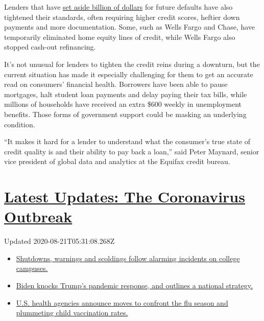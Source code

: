 Lenders that have
\href{https://www.nytimes3xbfgragh.onion/2020/07/14/business/big-banks-quarterly-results.html}{set
aside billion of dollars} for future defaults have also tightened their
standards, often requiring higher credit scores, heftier down payments
and more documentation. Some, such as Wells Fargo and Chase, have
temporarily eliminated home equity lines of credit, while Wells Fargo
also stopped cash-out refinancing.

It's not unusual for lenders to tighten the credit reins during a
downturn, but the current situation has made it especially challenging
for them to get an accurate read on consumers' financial health.
Borrowers have been able to pause mortgages, halt student loan payments
and delay paying their tax bills, while millions of households have
received an extra \$600 weekly in unemployment benefits. Those forms of
government support could be masking an underlying condition.

``It makes it hard for a lender to understand what the consumer's true
state of credit quality is and their ability to pay back a loan,'' said
Peter Maynard, senior vice president of global data and analytics at the
Equifax credit bureau.

\hypertarget{latest-updates-the-coronavirus-outbreak}{%
\section{\texorpdfstring{\href{https://www.nytimes3xbfgragh.onion/2020/08/20/world/coronavirus-covid.html?action=click\&pgtype=Article\&state=default\&region=MAIN_CONTENT_1\&context=storylines_live_updates}{Latest
Updates: The Coronavirus
Outbreak}}{Latest Updates: The Coronavirus Outbreak}}\label{latest-updates-the-coronavirus-outbreak}}

Updated 2020-08-21T05:31:08.268Z

\begin{itemize}
\tightlist
\item
  \href{https://www.nytimes3xbfgragh.onion/2020/08/20/world/coronavirus-covid.html?action=click\&pgtype=Article\&state=default\&region=MAIN_CONTENT_1\&context=storylines_live_updates\#link-68774d88}{Shutdowns,
  warnings and scoldings follow alarming incidents on college campuses.}
\item
  \href{https://www.nytimes3xbfgragh.onion/2020/08/20/world/coronavirus-covid.html?action=click\&pgtype=Article\&state=default\&region=MAIN_CONTENT_1\&context=storylines_live_updates\#link-26b58724}{Biden
  knocks Trump's pandemic response, and outlines a national strategy.}
\item
  \href{https://www.nytimes3xbfgragh.onion/2020/08/20/world/coronavirus-covid.html?action=click\&pgtype=Article\&state=default\&region=MAIN_CONTENT_1\&context=storylines_live_updates\#link-4e542da3}{U.S.
  health agencies announce moves to confront the flu season and
  plummeting child vaccination rates.}
\end{itemize}

